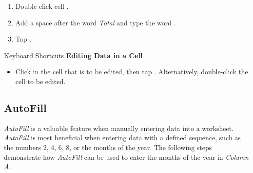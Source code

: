 \begin{enumbox}
\begin{enumerate}
		\item Double click cell .
		\item Add a space after the word \textit{Total} and type the word .
		\item Tap .
	\end{enumerate}
\end{enumbox}
	
\begin{center}
	\begin{shtcutbox}{Keyboard Shortcuts}
		\textbf{Editing Data in a Cell}
		\\
		\begin{itemize}
			\setlength{\itemsep}{0pt}
			\setlength{\parskip}{0pt}
			\setlength{\parsep}{0pt}
			
			\item Click in the cell that is to be edited, then tap . Alternatively, double-click the cell to be edited.
			
		\end{itemize}
	\end{shtcutbox}
\end{center}

\subsection{AutoFill}

\textit{AutoFill} is a valuable feature when manually entering data into a worksheet. \textit{AutoFill} is most beneficial when entering data with a defined sequence, such as the numbers $ 2 $, $ 4 $, $ 6 $, $ 8 $, or the months of the year. The following steps demonstrate how \textit{AutoFill} can be used to enter the months of the year in \textit{Column A}.

